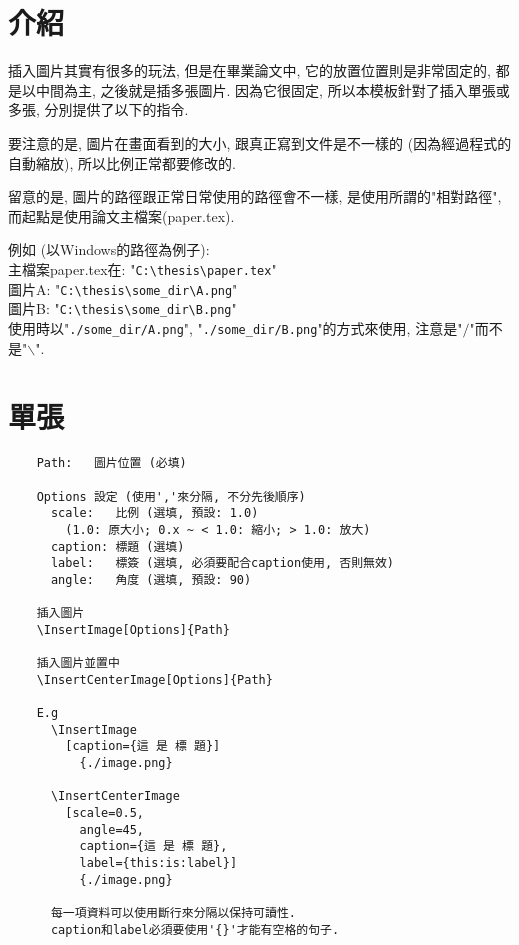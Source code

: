 \section{介紹}

插入圖片其實有很多的玩法, 但是在畢業論文中, 它的放置位置則是非常固定的, 都是以中間為主, 之後就是插多張圖片. 因為它很固定, 所以本模板針對了插入單張或多張, 分別提供了以下的指令.

要注意的是, 圖片在畫面看到的大小, 跟真正寫到文件是不一樣的 (因為經過程式的自動縮放), 所以比例正常都要修改的.

留意的是, 圖片的路徑跟正常日常使用的路徑會不一樣, 是使用所謂的"相對路徑", 而起點是使用論文主檔案(paper.tex).

\noindent 例如 (以Windows的路徑為例子):\\
主檔案paper.tex在: "\verb|C:\thesis\paper.tex|"\\
圖片A: "\verb|C:\thesis\some_dir\A.png|"\\
圖片B: "\verb|C:\thesis\some_dir\B.png|"\\
使用時以"\verb|./some_dir/A.png|", "\verb|./some_dir/B.png|"的方式來使用, 注意是"$/$"而不是"$\backslash$".


\newpage
\section{單張}

  \begin{framed}
  \begin{verbatim}
    Path:   圖片位置 (必填)

    Options 設定 (使用','來分隔, 不分先後順序)
      scale:   比例 (選填, 預設: 1.0)
        (1.0: 原大小; 0.x ~ < 1.0: 縮小; > 1.0: 放大)
      caption: 標題 (選填)
      label:   標簽 (選填, 必須要配合caption使用, 否則無效)
      angle:   角度 (選填, 預設: 90)

    插入圖片
    \InsertImage[Options]{Path}

    插入圖片並置中
    \InsertCenterImage[Options]{Path}

    E.g
      \InsertImage
        [caption={這 是 標 題}]
          {./image.png}

      \InsertCenterImage
        [scale=0.5,
          angle=45,
          caption={這 是 標 題},
          label={this:is:label}]
          {./image.png}

      每一項資料可以使用斷行來分隔以保持可讀性.
      caption和label必須要使用'{}'才能有空格的句子.
  \end{verbatim}
  \end{framed}

